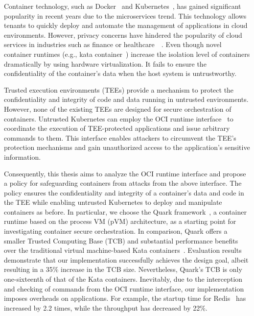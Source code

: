 




Container technology, such as Docker~\cite*{docker} and Kubernetes~\cite*{k8s}, has gained significant popularity in recent years due to the microservices trend. This technology allows tenants to quickly deploy and automate the management of applications in cloud environments. However, privacy concerns 
have hindered the popularity of cloud services in industries such as finance or healthcare~\cite*{data_privacy}~\cite*{eu_data_Privacy}. Even though novel container runtimes (e.g., kata container~\cite*{Kata-Containers}) increase the isolation level of containers dramatically by using hardware virtualization. 
It fails to ensure the confidentiality of the container's data when the host system is untrustworthy.

Trusted execution environments (\acrshort{TEE}s) provide a mechanism to protect the confidentiality and integrity of code and data running in untrusted environments. However, none of the existing TEEs are designed for secure orchestration of containers. Untrusted Kubernetes can employ the OCI runtime interface~\cite*{oci-runtime-spec} to coordinate the execution of 
TEE-protected applications and issue arbitrary commands to them. This interface enables attackers to circumvent the TEE's protection mechanisms and gain unauthorized access to the application's sensitive information.

Consequently, this thesis aims to analyze the OCI runtime interface and propose a policy for safeguarding containers from attacks from the above interface. The policy ensures the confidentiality and integrity of a container's data and code in the TEE while enabling untrusted Kubernetes\cite*{k8s} to deploy and manipulate containers as 
before. In particular, we choose the Quark framework~\cite*{quark}, a container runtime based on the process VM (\acrshort{pVM}) architecture, as a starting point for investigating container secure orchestration. In comparison, Quark offers a smaller Trusted Computing Base (\acrshort{TCB}) and substantial performance 
benefits over the traditional virtual machine-based Kata containers~\cite*{quark_performance_report}. Evaluation results demonstrate that our implementation successfully achieves the design goal, albeit resulting in a 35\% increase in the \acrshort{TCB} size. Nevertheless, Quark's \acrshort{TCB} is only 
one-sixteenth of that of the Kata containers. Inevitably, due to the interception and checking of commands from the OCI runtime interface, our implementation imposes overheads on applications.  For example, the startup time for Redis~\cite*{redis} has increased by 2.2 times, while the throughput has decreased by 22\%.


